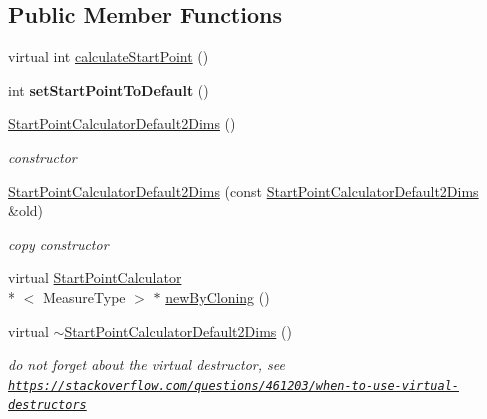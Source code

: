 \subsection*{Public Member Functions}
\begin{DoxyCompactItemize}
\item 
virtual int \hyperlink{class_ox_1_1_start_point_calculator_default2_dims_a773ad51253df4757c983db76187e79d3}{calculate\-Start\-Point} ()
\item 
\hypertarget{class_ox_1_1_start_point_calculator_default2_dims_a96c95c702272ac52b33d1fedd83bfb19}{int {\bfseries set\-Start\-Point\-To\-Default} ()}\label{class_ox_1_1_start_point_calculator_default2_dims_a96c95c702272ac52b33d1fedd83bfb19}

\item 
\hypertarget{class_ox_1_1_start_point_calculator_default2_dims_a55619424baa13c86c994046c7f99e334}{\hyperlink{class_ox_1_1_start_point_calculator_default2_dims_a55619424baa13c86c994046c7f99e334}{Start\-Point\-Calculator\-Default2\-Dims} ()}\label{class_ox_1_1_start_point_calculator_default2_dims_a55619424baa13c86c994046c7f99e334}

\begin{DoxyCompactList}\small\item\em constructor \end{DoxyCompactList}\item 
\hypertarget{class_ox_1_1_start_point_calculator_default2_dims_af10f89dce256b5624b6c689b9478e5b5}{\hyperlink{class_ox_1_1_start_point_calculator_default2_dims_af10f89dce256b5624b6c689b9478e5b5}{Start\-Point\-Calculator\-Default2\-Dims} (const \hyperlink{class_ox_1_1_start_point_calculator_default2_dims}{Start\-Point\-Calculator\-Default2\-Dims} \&old)}\label{class_ox_1_1_start_point_calculator_default2_dims_af10f89dce256b5624b6c689b9478e5b5}

\begin{DoxyCompactList}\small\item\em copy constructor \end{DoxyCompactList}\item 
virtual \hyperlink{class_ox_1_1_start_point_calculator}{Start\-Point\-Calculator}\\*
$<$ Measure\-Type $>$ $\ast$ \hyperlink{class_ox_1_1_start_point_calculator_default2_dims_a4a3518c3b4d8f329784caa0e2f6e9165}{new\-By\-Cloning} ()
\item 
\hypertarget{class_ox_1_1_start_point_calculator_default2_dims_a93ba59c737cc2c5c6a6837768ab8a3d4}{virtual \hyperlink{class_ox_1_1_start_point_calculator_default2_dims_a93ba59c737cc2c5c6a6837768ab8a3d4}{$\sim$\-Start\-Point\-Calculator\-Default2\-Dims} ()}\label{class_ox_1_1_start_point_calculator_default2_dims_a93ba59c737cc2c5c6a6837768ab8a3d4}

\begin{DoxyCompactList}\small\item\em do not forget about the virtual destructor, see \href{https://stackoverflow.com/questions/461203/when-to-use-virtual-destructors}{\tt https\-://stackoverflow.\-com/questions/461203/when-\/to-\/use-\/virtual-\/destructors} \end{DoxyCompactList}\end{DoxyCompactItemize}
